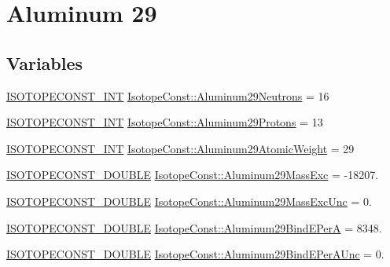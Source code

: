 \hypertarget{group___isotope_const-_aluminum-_al29}{}\section{Aluminum 29}
\label{group___isotope_const-_aluminum-_al29}
\subsection*{Variables}
\begin{DoxyCompactItemize}
\item 
\mbox{\hyperlink{group___isotope_const-_macros_ga5f18360b3e99483a35c32d789e62621c}{I\+S\+O\+T\+O\+P\+E\+C\+O\+N\+S\+T\+\_\+\+I\+NT}} \mbox{\hyperlink{group___isotope_const-_aluminum-_al29_gad2d415468da118cb12320d56ad92c444}{Isotope\+Const\+::\+Aluminum29\+Neutrons}} = 16
\item 
\mbox{\hyperlink{group___isotope_const-_macros_ga5f18360b3e99483a35c32d789e62621c}{I\+S\+O\+T\+O\+P\+E\+C\+O\+N\+S\+T\+\_\+\+I\+NT}} \mbox{\hyperlink{group___isotope_const-_aluminum-_al29_ga4c029da934edd2dade522abdf12b4de5}{Isotope\+Const\+::\+Aluminum29\+Protons}} = 13
\item 
\mbox{\hyperlink{group___isotope_const-_macros_ga5f18360b3e99483a35c32d789e62621c}{I\+S\+O\+T\+O\+P\+E\+C\+O\+N\+S\+T\+\_\+\+I\+NT}} \mbox{\hyperlink{group___isotope_const-_aluminum-_al29_ga8876b50c495608e0722c33875607af84}{Isotope\+Const\+::\+Aluminum29\+Atomic\+Weight}} = 29
\item 
\mbox{\hyperlink{group___isotope_const-_macros_ga8f45a7272ce02c0b4c65c44636ed719a}{I\+S\+O\+T\+O\+P\+E\+C\+O\+N\+S\+T\+\_\+\+D\+O\+U\+B\+LE}} \mbox{\hyperlink{group___isotope_const-_aluminum-_al29_ga2e7f23ef273027c53f21b03f2eb80d8a}{Isotope\+Const\+::\+Aluminum29\+Mass\+Exc}} = -\/18207.
\item 
\mbox{\hyperlink{group___isotope_const-_macros_ga8f45a7272ce02c0b4c65c44636ed719a}{I\+S\+O\+T\+O\+P\+E\+C\+O\+N\+S\+T\+\_\+\+D\+O\+U\+B\+LE}} \mbox{\hyperlink{group___isotope_const-_aluminum-_al29_ga49e8abc59c546c7c5f490e2a32287b4f}{Isotope\+Const\+::\+Aluminum29\+Mass\+Exc\+Unc}} = 0.
\item 
\mbox{\hyperlink{group___isotope_const-_macros_ga8f45a7272ce02c0b4c65c44636ed719a}{I\+S\+O\+T\+O\+P\+E\+C\+O\+N\+S\+T\+\_\+\+D\+O\+U\+B\+LE}} \mbox{\hyperlink{group___isotope_const-_aluminum-_al29_gacae6786fe77afa4a9f016c0f16ef28ce}{Isotope\+Const\+::\+Aluminum29\+Bind\+E\+PerA}} = 8348.
\item 
\mbox{\hyperlink{group___isotope_const-_macros_ga8f45a7272ce02c0b4c65c44636ed719a}{I\+S\+O\+T\+O\+P\+E\+C\+O\+N\+S\+T\+\_\+\+D\+O\+U\+B\+LE}} \mbox{\hyperlink{group___isotope_const-_aluminum-_al29_ga9bd2dcebfc72c9f46a85939b3d659809}{Isotope\+Const\+::\+Aluminum29\+Bind\+E\+Per\+A\+Unc}} = 0.

\end{DoxyCompactItemize}
